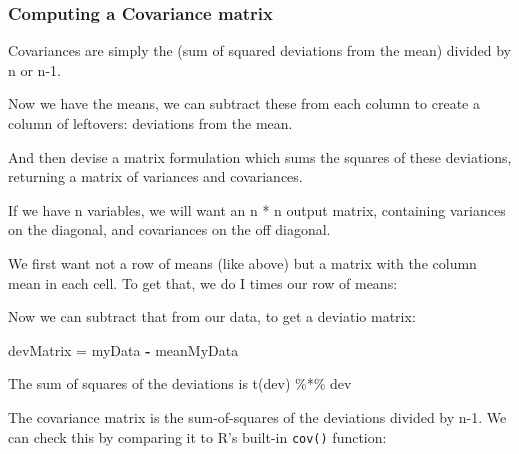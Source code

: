 \documentclass[11pt,]{article}
\newenvironment{Shaded}{\begin{snugshade}}{\end{snugshade}}
\newcommand{\KeywordTok}[1]{\textcolor[rgb]{0.13,0.29,0.53}{\textbf{#1}}}
\newcommand{\StringTok}[1]{\textcolor[rgb]{0.31,0.60,0.02}{#1}}
\newcommand{\OperatorTok}[1]{\textcolor[rgb]{0.81,0.36,0.00}{\textbf{#1}}}
\newcommand{\NormalTok}[1]{#1}
\begin{document}
\subsubsection{Computing a Covariance
matrix}\label{computing-a-covariance-matrix}

Covariances are simply the (sum of squared deviations from the mean)
divided by n or n-1.

Now we have the means, we can subtract these from each column to create
a column of leftovers: deviations from the mean.

And then devise a matrix formulation which sums the squares of these
deviations, returning a matrix of variances and covariances.

If we have n variables, we will want an n * n output matrix, containing
variances on the diagonal, and covariances on the off diagonal.

We first want not a row of means (like above) but a matrix with the
column mean in each cell. To get that, we do I times our row of means:

\begin{Shaded}
\end{Shaded}

Now we can subtract that from our data, to get a deviatio matrix:

\begin{Shaded}
\begin{Highlighting}[]
\NormalTok{devMatrix =}\StringTok{ }\NormalTok{myData }\OperatorTok{-}\StringTok{ }\NormalTok{meanMyData}
\end{Highlighting}
\end{Shaded}

The sum of squares of the deviations is t(dev) \%*\% dev

\begin{Shaded}
\end{Shaded}

The covariance matrix is the sum-of-squares of the deviations divided by
n-1. We can check this by comparing it to R's built-in \texttt{cov()}
function:
\end{document}
